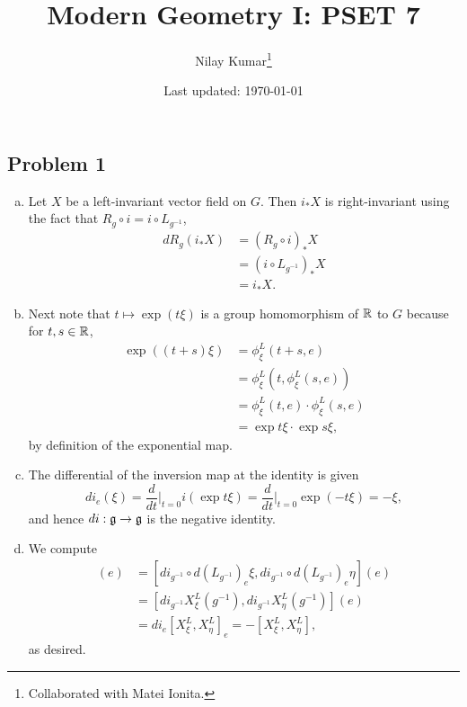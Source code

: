 \documentclass{../mathnotes}
\title{Modern Geometry I: PSET 7}
\author{Nilay Kumar\footnote{Collaborated with Matei Ionita.}}
\date{Last updated: \today}
\begin{document}
\maketitle

\subsection*{Problem 1}
\begin{enumerate}[(a)]
    \item Let $X$ be a left-invariant vector field on $G$. Then $i_*X$ is right-invariant
        using the fact that $R_g\circ i=i\circ L_{g^{-1}}$,
        \begin{align*}
            dR_g(i_*X) &= (R_g\circ i)_*X\\\
            &= (i\circ L_{g^{-1}})_*X\\
            &= i_*X.
        \end{align*}
    \item Next note that $t\mapsto\exp(t\xi)$ is a group homomorphism of $\mathbb{R}$ to $G$ because
        for $t,s\in\mathbb{R}$,
        \begin{align*}
            \exp\left( (t+s)\xi \right) &= \phi_\xi^L(t+s,e)\\
            &= \phi_\xi^L(t,\phi_\xi^L(s,e))\\
            &= \phi_\xi^L(t,e)\cdot \phi_\xi^L(s,e)\\
            &=\exp t\xi\cdot\exp s\xi,
        \end{align*}
        by definition of the exponential map.
    \item The differential of the inversion map at the identity is given
        \[di_e(\xi)=\frac{d}{dt}\bigg|_{t=0}i\left(\exp t\xi\right)=\frac{d}{dt}\bigg|_{t=0}\exp(-t\xi)=-\xi,\]
        and hence $di:\mathfrak g\to\mathfrak g$ is the negative identity.
    \item We compute
        \begin{align*}
            [d(R_g)_e\xi,d(R_g)_e\eta](e) &= [di_{g^{-1}}\circ d(L_{g^{-1}})_e\xi,di_{g^{-1}}\circ d(L_{g^{-1}})_e\eta](e)\\
            &=[di_{g^{-1}}X^L_\xi(g^{-1}),di_{g^{-1}}X^L_\eta(g^{-1})](e)\\
            &=di_e[X^L_\xi,X^L_\eta]_e=-[X_\xi^L,X_\eta^L],
        \end{align*}
        as desired.
\end{enumerate}
\end{document}

